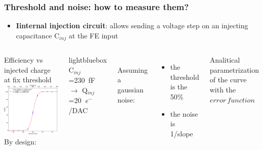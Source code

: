     \begin{frame}
        \frametitle{Threshold and noise: how to measure them?}
        \begin{itemize}
            \item\textbf{Iinternal injection circuit}: allows sending a voltage step on an injecting capacitance C$_{inj}$ at the FE input
        \end{itemize}
        \bigskip
        \begin{columns}
                Efficiency vs injected charge at fix threshold
                \includegraphics[width=1.1\linewidth]{figures/charaterization/scurve.pdf}
                By design:
                \begin{beamercolorbox}[ rounded=true, center]{lightbluebox}
                    C$_{inj}$=\SI{230}{fF} $\rightarrow$ Q$_{inj}$=\SI{20}{\elementarycharge}$^-$/DAC
                \end{beamercolorbox}
                \\
                \bigskip
                Assuming a gaussian noise:
                \begin{itemize}
                    \item the threshold is the 50\%
                    \item the noise is 1/slope 
                \end{itemize}
                \medskip
                Analitical parametrization of the curve with the $error\,function$
        \end{columns}
    \end{frame}

